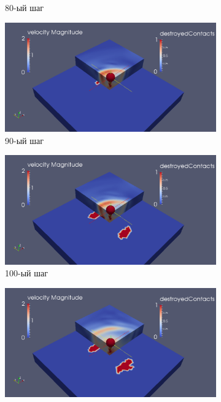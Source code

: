 \begin{figure}[H]
\begin{subfigure}[b]{0.5\textwidth}
\caption{80-ый шаг}
\end{subfigure}
\begin{subfigure}[b]{0.5\textwidth}
\centering
\includegraphics[width=1.0\textwidth]{png/delamination/double_clip/90.png}
\caption{90-ый шаг}
\end{subfigure}
\begin{subfigure}[b]{0.5\textwidth}
\centering
\includegraphics[width=1.0\textwidth]{png/delamination/double_clip/100.png}
\caption{100-ый шаг}
\end{subfigure}
\begin{subfigure}[b]{0.5\textwidth}
\centering
\includegraphics[width=1.0\textwidth]{png/delamination/double_clip/150.png}

\end{subfigure}
\end{figure}
